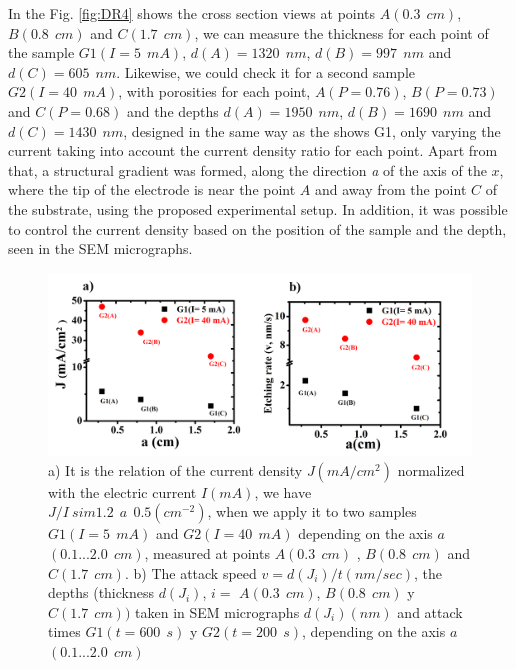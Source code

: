 \documentclass{article}
\begin{document}
In the Fig. \ref{fig:DR4} shows the cross section views   at points $
A (0.3 \ \ cm) $, $ B (0.8 \ \ cm) $ and $ C (1.7 \ \ cm) $, we can
measure the thickness for each point of the sample $ G1 (I = 5 \ \ mA)
$, $ d (A) = 1320 \ \ nm $, $ d (B) = 997 \ \ nm $ and $ d (C) = 605 \
\ nm $. Likewise, we could check it for a second sample $ G2 (I = 40 \
\ mA) $, with porosities for each point, $ A (P = 0.76) $, $ B (P =
0.73) $ and $ C (P = 0.68) $ and the depths $ d (A) = 1950 \ \ nm $, $
d (B) = 1690 \ \ nm $ and $ d (C) = 1430 \ \ nm $, designed in the
same way as the shows G1, only varying the current taking into account
the current density ratio for each point. Apart from that, a
structural gradient was formed, along the direction \emph{ a}  of the
axis of the $ x $, where the tip of the electrode is near the point $
A $ and away from the point $ C $ of the substrate, using the proposed
experimental setup. In addition, it was possible to control the
current density based on the position of the sample and the depth,
seen in the SEM micrographs.
 \begin{figure}
   \centering
   \includegraphics[width=\textwidth]{Images/grinJDR}
   \caption{a) It is the relation of the current density $
       J (mA / cm ^ 2) $ normalized with the electric current $ I
       (mA) $, we have $ J / I \ sim 1.2 \ \ a \ \ 0.5 ( cm^{-2})
       $, when we apply it to two samples $ G1 (I = 5 \ \ mA) $
       and $ G2 (I = 40 \ \ mA) $ depending on the axis $ a $ $
       (0.1 ... 2.0 \ \ cm) $, measured at points $ A (0.3 \ \
       cm) $ , $ B (0.8 \ \ cm) $ and $ C (1.7 \ \ cm) $. b) The
       attack speed $ v = d (J_i) / t (nm / sec) $, the depths
       (thickness $ d (J_i) $, $ i = $ $ A (0.3 \ \ cm) $, $ B (
       0.8 \ \ cm) $ y $ C (1.7 \ \ cm)) $ taken in SEM
       micrographs $ d (J_i) (nm) $ and attack times $ G1 (t =
       600 \ \ s) $ y $ G2 (t = 200 \ \ s) $, depending on the
       axis $ a $ $ (0.1 ... 2.0 \ \ cm) $ }
   \label{fig:JDR}
 \end{figure}
\end{document}
